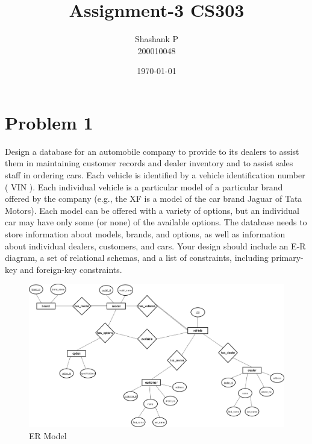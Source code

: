 \documentclass{article}
\title{Assignment-3 CS303}
\author{Shashank P \\ 200010048}
\date{\today}
\begin{document}
\maketitle




\section{Problem 1}
Design a database for an automobile company to provide to its dealers to assist them in maintaining
customer records and dealer inventory and to assist sales staff in ordering cars.
Each vehicle is identified by a vehicle identification number ( VIN ). Each individual vehicle is a
particular model of a particular brand offered by the company (e.g., the XF is a model of the car brand
Jaguar of Tata Motors). Each model can be offered with a variety of options, but an individual car may
have only some (or none) of the available options. The database needs to store information about models,
brands, and options, as well as information about individual dealers, customers, and cars. Your design
should include an E-R diagram, a set of relational schemas, and a list of constraints, including
primary-key and foreign-key constraints.


\begin{figure}[!ht]
  \begin{center}
    \includegraphics[scale=0.3]{1.jpg}
  \caption{ER Model}
  \end{center}
\end{figure}
\end{document}
